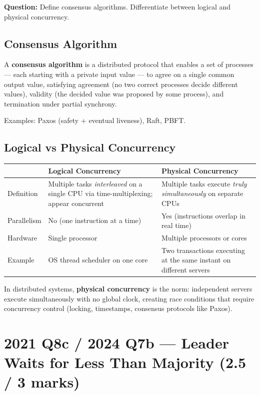\documentclass[12pt,a4paper]{article}
\begin{document}
\textbf{Question:} Define consensus algorithms. Differentiate between logical and physical concurrency.

\subsection*{Consensus Algorithm}

A \textbf{consensus algorithm} is a distributed protocol that enables a set of processes --- each starting with a private input value --- to agree on a single common output value, satisfying agreement (no two correct processes decide different values), validity (the decided value was proposed by some process), and termination under partial synchrony.

Examples: Paxos (safety + eventual liveness), Raft, PBFT.

\subsection*{Logical vs Physical Concurrency}

\begin{center}
\begin{tabular}{@{}p{3.2cm}p{5.5cm}p{5.5cm}@{}}
\toprule
 & \textbf{Logical Concurrency} & \textbf{Physical Concurrency} \\
\midrule
Definition & Multiple tasks \emph{interleaved} on a single CPU via time-multiplexing; appear concurrent & Multiple tasks execute \emph{truly simultaneously} on separate CPUs \\
Parallelism & No (one instruction at a time) & Yes (instructions overlap in real time) \\
Hardware & Single processor & Multiple processors or cores \\
Example & OS thread scheduler on one core & Two transactions executing at the same instant on different servers \\
\bottomrule
\end{tabular}
\end{center}

In distributed systems, \textbf{physical concurrency} is the norm: independent servers execute simultaneously with no global clock, creating race conditions that require concurrency control (locking, timestamps, consensus protocols like Paxos).

\section{2021 Q8c / 2024 Q7b --- Leader Waits for Less Than Majority (2.5 / 3 marks)}
\end{document}
